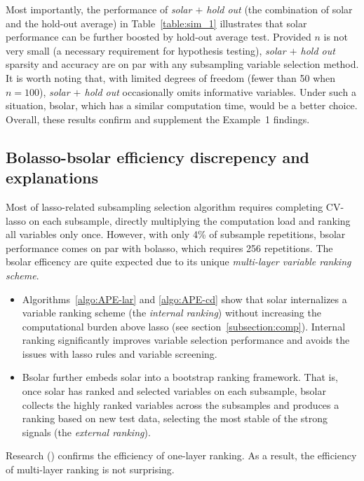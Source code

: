 \documentclass[11pt,authoryear]{elsarticle}
\begin{document}
Most importantly, the performance of \emph{solar $+$ hold out} (the combination of solar and the hold-out average) in Table~\ref{table:sim_1} illustrates that solar performance can be further boosted by hold-out average test. Provided $n$ is not very small (a necessary requirement for hypothesis testing), \emph{solar $+$ hold out} sparsity and accuracy are on par with any subsampling variable selection method. It is worth noting that, with limited degrees of freedom (fewer than 50 when $n=100$), \emph{solar $+$ hold out} occasionally omits informative variables. Under such a situation, bsolar, which has a similar computation time, would be a better choice. Overall, these results confirm and supplement the Example~1 findings.

\subsection{Bolasso-bsolar efficiency discrepency and explanations}

Most of lasso-related subsampling selection algorithm requires completing CV-lasso on each subsample, directly multiplying the computation load and ranking all variables only once. However, with only 4\% of subsample repetitions, bsolar performance comes on par with bolasso, which requires 256 repetitions. The bsolar efficency are quite expected due to its unique \emph{multi-layer variable ranking scheme}.

\begin{itemize}
  \item Algorithms~\ref{algo:APE-lar} and \ref{algo:APE-cd} show that solar internalizes a variable ranking scheme (the \emph{internal ranking}) without increasing the computational burden above lasso (see section~\ref{subsection:comp}). Internal ranking significantly improves variable selection performance and avoids the issues with lasso rules and variable screening.

  \item Bsolar further embeds solar into a bootstrap ranking framework. That is, once solar has ranked and selected variables on each subsample, bsolar collects the highly ranked variables across the subsamples and produces a ranking based on new test data, selecting the most stable of the strong signals (the \emph{external ranking}).
\end{itemize}

\noindent
Research (\citet{fan2008sure, hall2009usingb, hall2009using, li2012robust, li2012feature}) confirms the efficiency of one-layer ranking. As a result, the efficiency of multi-layer ranking is not surprising.
\end{document}
